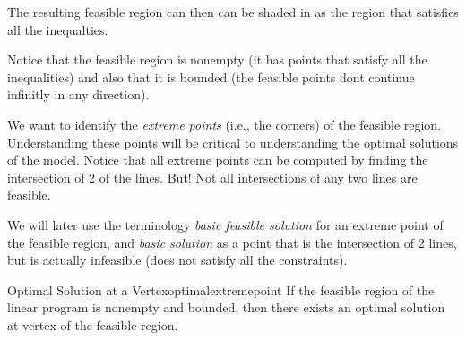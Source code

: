 
The resulting feasible region can then can be shaded in as the region that satisfies all the inequalties.


Notice that the feasible region is nonempty (it has points that satisfy all the inequalities) and also that it is bounded (the feasible points dont continue infinitly in any direction).

We want to identify the \emph{extreme points} (i.e., the corners) of the feasible region. 
Understanding these points will be critical to understanding the optimal solutions of the model.
Notice that all extreme points can be computed by finding the intersection of 2 of the lines.   But!  Not all intersections of any two lines are feasible.  

We will later use the terminology \emph{basic feasible solution} for an extreme point of the feasible region, and \emph{basic solution} as a point that is the intersection of 2 lines, but is actually infeasible (does not satisfy all the constraints).


\begin{theorem}{Optimal Solution at a Vertex}{optimalextremepoint}
If the feasible region of the linear program is nonempty and bounded, then there exists an optimal solution at vertex of the feasible region.
\label{thm:optimalextremepoint}
\end{theorem}

